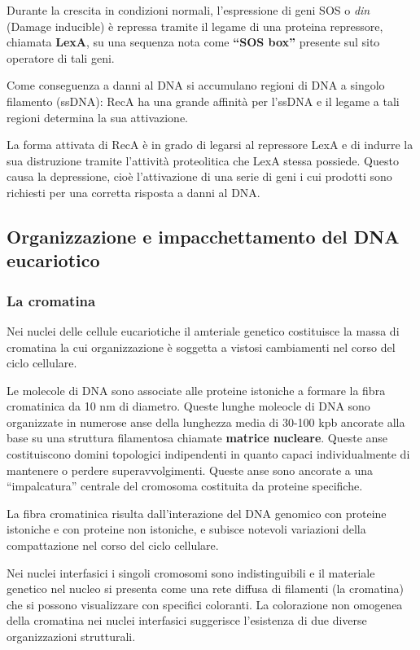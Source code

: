 \documentclass[]{article}
\begin{document}
Durante la crescita in condizioni normali, l'espressione di geni SOS o
\emph{din} (Damage inducible) è repressa tramite il legame di una
proteina repressore, chiamata \textbf{LexA}, su una sequenza nota come
\textbf{``SOS box''} presente sul sito operatore di tali geni.

Come conseguenza a danni al DNA si accumulano regioni di DNA a singolo
filamento (ssDNA): RecA ha una grande affinità per l'ssDNA e il legame a
tali regioni determina la sua attivazione.

La forma attivata di RecA è in grado di legarsi al repressore LexA e di
indurre la sua distruzione tramite l'attività proteolitica che LexA
stessa possiede. Questo causa la depressione, cioè l'attivazione di una
serie di geni i cui prodotti sono richiesti per una corretta risposta a
danni al DNA.

\subsection{Organizzazione e impacchettamento del DNA
eucariotico}\label{organizzazione-e-impacchettamento-del-dna-eucariotico}

\subsubsection{La cromatina}\label{la-cromatina}

Nei nuclei delle cellule eucariotiche il amteriale genetico costituisce
la massa di cromatina la cui organizzazione è soggetta a vistosi
cambiamenti nel corso del ciclo cellulare.

Le molecole di DNA sono associate alle proteine istoniche a formare la
fibra cromatinica da 10 nm di diametro. Queste lunghe moleocle di DNA
sono organizzate in numerose anse della lunghezza media di 30-100 kpb
ancorate alla base su una struttura filamentosa chiamate \textbf{matrice
nucleare}. Queste anse costituiscono domini topologici indipendenti in
quanto capaci individualmente di mantenere o perdere superavvolgimenti.
Queste anse sono ancorate a una ``impalcatura'' centrale del cromosoma
costituita da proteine specifiche.

La fibra cromatinica risulta dall'interazione del DNA genomico con
proteine istoniche e con proteine non istoniche, e subisce notevoli
variazioni della compattazione nel corso del ciclo cellulare.

Nei nuclei interfasici i singoli cromosomi sono indistinguibili e il
materiale genetico nel nucleo si presenta come una rete diffusa di
filamenti (la cromatina) che si possono visualizzare con specifici
coloranti. La colorazione non omogenea della cromatina nei nuclei
interfasici suggerisce l'esistenza di due diverse organizzazioni
strutturali.
\end{document}
